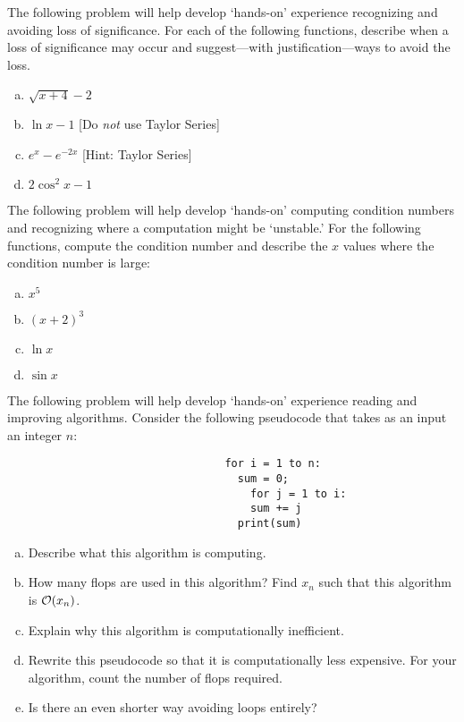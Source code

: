 \documentclass[11pt,letterpaper]{article}
\begin{document}
\newpage



 The following problem will help develop `hands-on' experience recognizing and avoiding loss of significance. For each of the following functions, describe when a loss of significance may occur and suggest---with justification---ways to avoid the loss. 
	\begin{enumerate}[(a)]
	\item $\sqrt{x + 4} - 2$
	\item $\ln x - 1$ [Do \textit{not} use Taylor Series]
	\item $e^x - e^{-2x}$ [Hint: Taylor Series]
	\item $2\cos^2 x - 1$
	\end{enumerate}



\newpage



 The following problem will help develop `hands-on' computing condition numbers and recognizing where a computation might be `unstable.' For the following functions, compute the condition number and describe the $x$ values where the condition number is large:
	\begin{enumerate}[(a)]
	\item $x^5$
	\item $(x + 2)^3$
	\item $\ln x$
	\item $\sin x$
	\end{enumerate}



\newpage



 The following problem will help develop `hands-on' experience reading and improving algorithms. Consider the following pseudocode that takes as an input an integer $n$:
	\begin{verbatim}
	                              for i = 1 to n:
	                                sum = 0;
	                                  for j = 1 to i:
	                                  sum += j
	                                print(sum)
	\end{verbatim}

\begin{enumerate}[(a)]
\item Describe what this algorithm is computing. 
\item How many flops are used in this algorithm? Find $x_n$ such that this algorithm is $\mathcal{O}(x_n)$. 
\item Explain why this algorithm is computationally inefficient. 
\item Rewrite this pseudocode so that it is computationally less expensive. For your algorithm, count the number of flops required. 
\item Is there an even shorter way avoiding loops entirely?
\end{enumerate}
\end{document}
